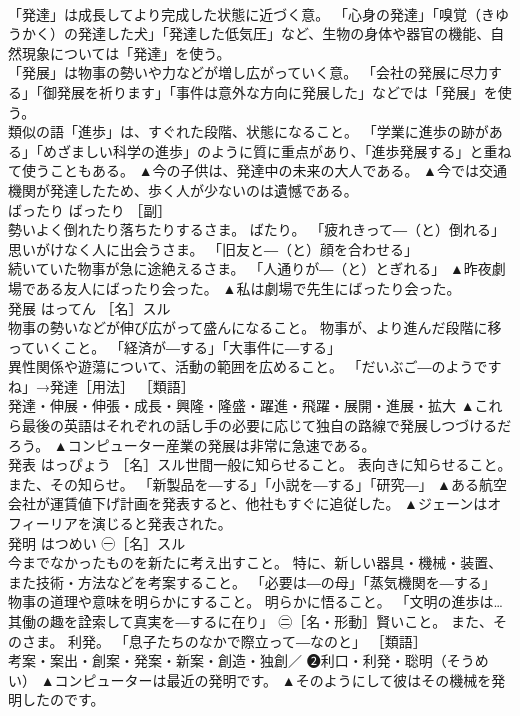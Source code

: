 \documentclass[8pt]{extreport}
\begin{document}
\begin{CJK}{UTF8}{min}
\\	「発達」は成長してより完成した状態に近づく意。 「心身の発達」「嗅覚（きゆうかく）の発達した犬」「発達した低気圧」など、生物の身体や器官の機能、自然現象については「発達」を使う。 
\\	「発展」は物事の勢いや力などが増し広がっていく意。 「会社の発展に尽力する」「御発展を祈ります」「事件は意外な方向に発展した」などでは「発展」を使う。 
\\	類似の語「進歩」は、すぐれた段階、状態になること。 「学業に進歩の跡がある」「めざましい科学の進歩」のように質に重点があり、「進歩発展する」と重ねて使うこともある。	▲今の子供は、発達中の未来の大人である。 ▲今では交通機関が発達したため、歩く人が少ないのは遺憾である。
\\	ばったり	ばったり	［副］ 
\\	勢いよく倒れたり落ちたりするさま。 ばたり。 「疲れきって―（と）倒れる」 
\\	思いがけなく人に出会うさま。 「旧友と―（と）顔を合わせる」 
\\	続いていた物事が急に途絶えるさま。 「人通りが―（と）とぎれる」	▲昨夜劇場である友人にばったり会った。 ▲私は劇場で先生にばったり会った。
\\	発展	はってん	［名］スル 
\\	物事の勢いなどが伸び広がって盛んになること。 物事が、より進んだ段階に移っていくこと。 「経済が―する」「大事件に―する」 
\\	異性関係や遊蕩について、活動の範囲を広めること。 「だいぶご―のようですね」→発達［用法］ ［類語］
\\	発達・伸展・伸張・成長・興隆・隆盛・躍進・飛躍・展開・進展・拡大	▲これら最後の英語はそれぞれの話し手の必要に応じて独自の路線で発展しつづけるだろう。 ▲コンピューター産業の発展は非常に急速である。
\\	発表	はっぴょう	［名］スル世間一般に知らせること。 表向きに知らせること。 また、その知らせ。 「新製品を―する」「小説を―する」「研究―」	▲ある航空会社が運賃値下げ計画を発表すると、他社もすぐに追従した。 ▲ジェーンはオフィーリアを演じると発表された。
\\	発明	はつめい	㊀［名］スル 
\\	今までなかったものを新たに考え出すこと。 特に、新しい器具・機械・装置、また技術・方法などを考案すること。 「必要は―の母」「蒸気機関を―する」 
\\	物事の道理や意味を明らかにすること。 明らかに悟ること。 「文明の進歩は…其働の趣を詮索して真実を―するに在り」 ㊁［名・形動］賢いこと。 また、そのさま。 利発。 「息子たちのなかで際立って―なのと」 ［類語］ 
\\	考案・案出・創案・発案・新案・創造・独創／ ❷利口・利発・聡明（そうめい）	▲コンピューターは最近の発明です。 ▲そのようにして彼はその機械を発明したのです。

\end{CJK}
\end{document}
